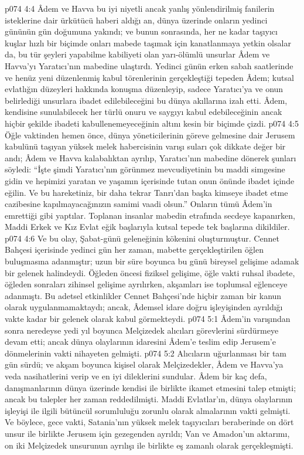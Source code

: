 \vs p074 4:4 Âdem ve Havva bu iyi niyetli ancak yanlış yönlendirilmiş fanilerin isteklerine dair ürkütücü haberi aldığı an, dünya üzerinde onların yedinci gününün gün doğumuna yakındı; ve bunun sonrasında, her ne kadar taşıyıcı kuşlar hızlı bir biçimde onları mabede taşımak için kanatlanmaya yetkin olsalar da, bu tür şeyleri yapabilme kabiliyeti olan yarı\hyp{}ölümlü unsurlar Âdem ve Havva’yı Yaratıcı’nın mabedine ulaştırdı. Yedinci günün erken sabah saatlerinde ve henüz yeni düzenlenmiş kabul törenlerinin gerçekleştiği tepeden Âdem; kutsal evlatlığın düzeyleri hakkında konuşma düzenleyip, sadece Yaratıcı’ya ve onun belirlediği unsurlara ibadet edilebileceğini bu dünya akıllarına izah etti. Âdem, kendisine sunulabilecek her türlü onuru ve saygıyı kabul edebileceğinin ancak hiçbir şekilde ibadeti kabullenemeyeceğinin altını kesin bir biçimde çizdi.
\vs p074 4:5 Öğle vaktinden hemen önce, dünya yöneticilerinin göreve gelmesine dair Jerusem kabulünü taşıyan yüksek melek habercisinin varışı suları çok dikkate değer bir andı; Âdem ve Havva kalabalıktan ayrılıp, Yaratıcı’nın mabedine dönerek şunları söyledi: “İşte şimdi Yaratıcı’nın görünmez mevcudiyetinin bu maddi simgesine gidin ve hepimizi yaratan ve yaşamın içerisinde tutan onun önünde ibadet içinde eğilin. Ve bu hareketiniz, bir daha tekrar Tanrı’dan başka kimseye ibadet etme cazibesine kapılmayacağınızın samimi vaadi olsun.” Onların tümü Âdem’in emrettiği gibi yaptılar. Toplanan insanlar mabedin etrafında secdeye kapanırken, Maddi Erkek ve Kız Evlat eğik başlarıyla kutsal tepede tek başlarına dikildiler.
\vs p074 4:6 Ve bu olay, Şabat\hyp{}günü geleneğinin kökenini oluşturmuştur. Cennet Bahçesi içerisinde yedinci gün her zaman, mabette gerçekleştirilen öğlen buluşmasına adanmıştır; uzun bir süre boyunca bu günü bireysel gelişime adamak bir gelenek halindeydi. Öğleden öncesi fiziksel gelişime, öğle vakti ruhsal ibadete, öğleden sonraları zihinsel gelişime ayrılırken, akşamları ise toplumsal eğlenceye adanmıştı. Bu adetsel etkinlikler Cennet Bahçesi’nde hiçbir zaman bir kanun olarak uygulanmamaktaydı; ancak, Âdemsel idare doğru işleyişinden ayrıldığı vakte kadar bir gelenek olarak kabul görmekteydi.
\vs p074 5:1 Âdem’in varışından sonra neredeyse yedi yıl boyunca Melçizedek alıcıları görevlerini sürdürmeye devam etti; ancak dünya olaylarının idaresini Âdem’e teslim edip Jerusem’e dönmelerinin vakti nihayeten gelmişti.
\vs p074 5:2 Alıcıların uğurlanması bir tam gün sürdü; ve akşam boyunca kişisel olarak Melçizedekler, Âdem ve Havva’ya veda nasihatlerini verip ve en iyi dileklerini sundular. Âdem bir kaç defa, danışmanlarının dünya üzerinde kendisi ile birlikte ikamet etmesini talep etmişti; ancak bu talepler her zaman reddedilmişti. Maddi Evlatlar’ın, dünya olaylarının işleyişi ile ilgili bütüncül sorumluluğu zorunlu olarak almalarının vakti gelmişti. Ve böylece, gece vakti, Satania’nın yüksek melek taşıyıcıları beraberinde on dört unsur ile birlikte Jerusem için gezegenden ayrıldı; Van ve Amadon’un aktarımı, on iki Melçizedek unsurunun ayrılışı ile birlikte eş zamanlı olarak gerçekleşmişti.
